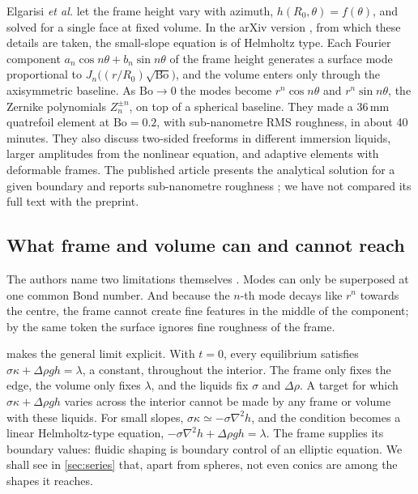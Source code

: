 \documentclass[11pt,a4paper]{article}
\numberwithin{equation}{section}
\begin{document}
Elgarisi \emph{et al.} \cite{elgarisi2021,elgarisi2021preprint} let the frame
height vary with azimuth, $h(R_0,\theta)=f(\theta)$, and solved for a single
face at fixed volume. In the arXiv version \cite{elgarisi2021preprint}, from
which these details are taken, the small-slope equation is of Helmholtz type.
Each Fourier component $a_n\cos n\theta+b_n\sin n\theta$ of the frame height
generates a surface mode proportional to
$J_n\bigl((r/R_0)\sqrt{\mathrm{Bo}}\bigr)$, and the volume enters only through
the axisymmetric baseline. As $\mathrm{Bo}\to0$ the modes become $r^n\cos n\theta$
and $r^n\sin n\theta$, the Zernike polynomials $Z_n^{\pm n}$, on top of a
spherical baseline. They made a 36\,mm quatrefoil element at
$\mathrm{Bo}=0.2$, with sub-nanometre RMS roughness, in about 40 minutes. They
also discuss two-sided freeforms in different immersion liquids, larger
amplitudes from the nonlinear equation, and adaptive elements with deformable
frames. The published article presents the analytical solution for a given
boundary and reports sub-nanometre roughness \cite{elgarisi2021}; we have not
compared its full text with the preprint.

\subsection{What frame and volume can and cannot reach}\label{sec:reach}
The authors name two limitations themselves \cite{elgarisi2021preprint}. Modes
can only be superposed at one common Bond number. And because the $n$-th mode
decays like $r^n$ towards the centre, the frame cannot create fine features in
the middle of the component; by the same token the surface ignores fine
roughness of the frame.

 makes the general limit explicit. With $t=0$, every
equilibrium satisfies $\sigma\kappa+\Delta\rho gh=\lambda$, a constant,
throughout the interior. The frame only fixes the edge, the volume only fixes
$\lambda$, and the liquids fix $\sigma$ and $\Delta\rho$. A target for which
$\sigma\kappa+\Delta\rho gh$ varies across the interior cannot be made by any
frame or volume with these liquids. For small slopes,
$\sigma\kappa\simeq-\sigma\nabla^2h$, and the condition becomes a linear
Helmholtz-type equation, $-\sigma\nabla^2h+\Delta\rho gh=\lambda$. The frame
supplies its boundary values: fluidic shaping is boundary control of an
elliptic equation. We shall see in \cref{sec:series} that, apart from
spheres, not even conics are among the shapes it reaches.
\end{document}
